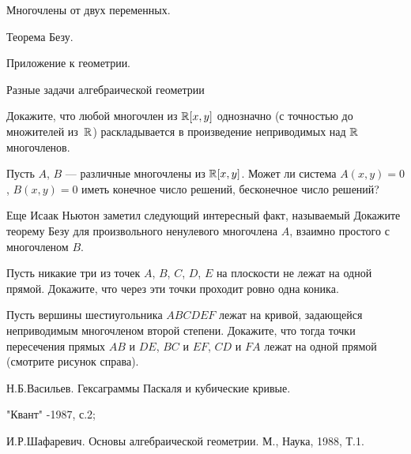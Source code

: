 \documentclass[a4paper,12pt]{article}
\begin{document}
\newpage
{}

\begin{nums}{-2}
\item Многочлены от двух переменных.

\item Теорема Безу.

\item Приложение к геометрии.

\item Разные задачи алгебраической геометрии


\end{nums}


 Докажите, что любой многочлен из $\mathbb{R}[x,y]$
однозначно (с точностью до множителей из~$\mathbb{R}$)
раскладывается в произведение неприводимых над  $\mathbb{R}$
\hbox{многочленов.}

  Пусть $A$, $B$ --- различные многочлены из $\mathbb{R}[x,y]$.
Может ли система $A(x,y)=0$, $B(x,y)=0$ иметь
конечное число решений,  бесконечное число решений?

  Еще Исаак Ньютон заметил следующий интересный факт, называемый
\/
\/
Докажите
теорему Безу  для произвольного ненулевого многочлена $A$,
взаимно простого с многочленом $B$.

Пусть никакие три из точек $A$, $B$, $C$, $D$, $E$ на плоскости не
лежат на одной прямой. Докажите, что
через эти точки %
проходит ровно одна коника.

 Пусть вершины шестиугольника
$ABCDEF$
лежат на кривой, задающейся неприводимым многочленом второй степени.
Докажите, что тогда
точки пересечения прямых $AB$ и $DE$, $BC$ и $EF$, $CD$ и $FA$
лежат на одной прямой
(смотрите рисунок справа).


Н.Б.Васильев. Гексаграммы Паскаля и кубические кривые.

"Квант" -1987, с.2;

И.Р.Шафаревич. Основы алгебраической геометрии. М., Наука, 1988, Т.1.
\end{document}
